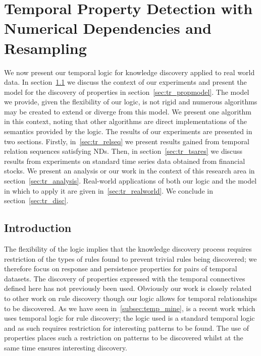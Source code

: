 \chapter{Temporal Property Detection with Numerical Dependencies and
Resampling}\label{chap:tempresult}

We now present our temporal logic for knowledge discovery applied to
real world data. In section~\ref{sec:tr_intro} we discuss  the context
of our experiments and present the model for the discovery of
properties in section~\ref{sec:tr_propmodel}. The model we provide,
given the flexibility of our logic, is not rigid and numerous
algorithms may be created to extend or diverge from this model. 
We present one algorithm in this context, noting that other algorithms
are direct implementations of the semantics provided by the logic. 
The results of our
experiments are presented in two sections. Firstly,
in~\ref{sec:tr_relseq} we present results gained from temporal
relation sequences satisfying NDs. Then, in
section~\ref{sec:tr_tsares} we discuss results from experiments on
standard time series data obtained from financial stocks. We present
an analysis or our work in the context of this research area in
section~\ref{sec:tr_analysis}. Real-world applications
of both our logic and the model in which to
apply it are given in~\ref{sec:tr_realworld}.
We conclude in section~\ref{sec:tr_disc}.

\section{Introduction}\label{sec:tr_intro}

The flexibility of the
logic implies that the knowledge discovery process requires
restriction of the types of rules found to prevent trivial rules being
discovered; we therefore focus on response and persistence properties
for pairs of temporal datasets. The discovery of properties expressed with
the temporal connectives defined here has not previously been
used. Obviously our 
work is closely related to other work on rule discovery though our
logic allows for temporal relationships to be discovered. As we have
seen in~\ref{subsec:temp_mine}, \cite{bt98} is
a recent work which uses temporal logic for rule discovery; the logic
used is a standard temporal logic and as such requires restriction for
interesting patterns to be found. The use of properties places such a
restriction on patterns to be discovered whilst at the same time
ensures interesting discovery.

